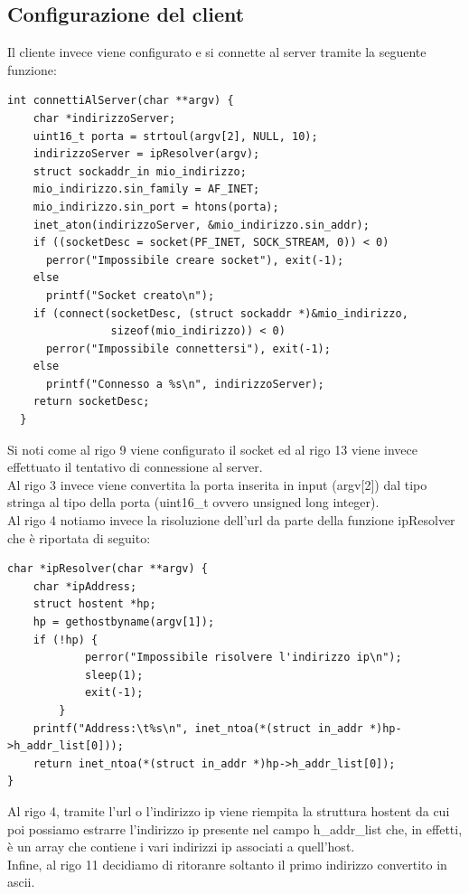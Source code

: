 \documentclass[a4paper]{article}
\begin{document}
\subsection{Configurazione del client}
Il cliente invece viene configurato e si connette al server tramite la seguente funzione:
\begin{lstlisting}[caption={Configurazione e connessione del client}]
int connettiAlServer(char **argv) {
    char *indirizzoServer;
    uint16_t porta = strtoul(argv[2], NULL, 10);
    indirizzoServer = ipResolver(argv);
    struct sockaddr_in mio_indirizzo;
    mio_indirizzo.sin_family = AF_INET;
    mio_indirizzo.sin_port = htons(porta);
    inet_aton(indirizzoServer, &mio_indirizzo.sin_addr);
    if ((socketDesc = socket(PF_INET, SOCK_STREAM, 0)) < 0)
      perror("Impossibile creare socket"), exit(-1);
    else
      printf("Socket creato\n");
    if (connect(socketDesc, (struct sockaddr *)&mio_indirizzo,
                sizeof(mio_indirizzo)) < 0)
      perror("Impossibile connettersi"), exit(-1);
    else
      printf("Connesso a %s\n", indirizzoServer);
    return socketDesc;
  }
\end{lstlisting}
Si noti come al rigo 9 viene configurato il socket ed al rigo 13 viene invece effettuato il tentativo di connessione al server.\\
Al rigo 3 invece viene convertita la porta inserita in input (argv$[$2$]$) dal tipo stringa al tipo della porta (uint16\_t ovvero unsigned long integer).\\
Al rigo 4 notiamo invece la risoluzione dell'url da parte della funzione ipResolver che è riportata di seguito:
\begin{lstlisting}[caption={Risoluzione url del client}]
char *ipResolver(char **argv) {
    char *ipAddress;
    struct hostent *hp;
    hp = gethostbyname(argv[1]);
    if (!hp) {
            perror("Impossibile risolvere l'indirizzo ip\n");
            sleep(1);
            exit(-1);
        }
    printf("Address:\t%s\n", inet_ntoa(*(struct in_addr *)hp->h_addr_list[0]));
    return inet_ntoa(*(struct in_addr *)hp->h_addr_list[0]);
}
\end{lstlisting}
Al rigo 4, tramite l'url o l'indirizzo ip viene riempita la struttura hostent da cui poi possiamo estrarre l'indirizzo ip presente nel campo 
h\_addr\_list  che, in effetti, è un array che contiene i vari indirizzi ip associati a quell'host.\\
Infine, al rigo 11 decidiamo di ritoranre soltanto il primo indirizzo convertito in ascii.
\pagebreak
\end{document}

